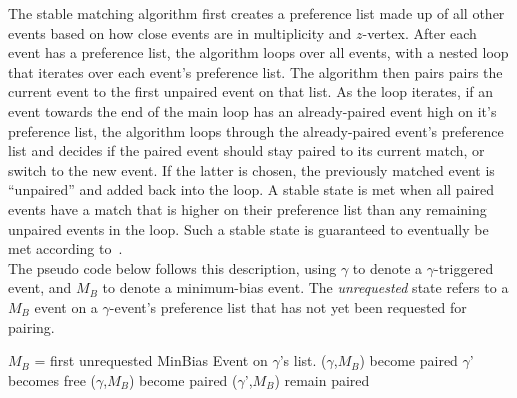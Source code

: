The stable matching algorithm first creates a preference list made up of all other events based on how close events are in multiplicity and $z$-vertex. After each event has a preference list, the algorithm loops over all events, with a nested loop that iterates over each event's preference list. The algorithm then pairs  pairs the current event to the first unpaired event on that list. As the loop iterates, if an event towards the end of the main loop has an already-paired event high on it’s preference list, the algorithm loops through the already-paired event's preference list and decides if the paired event should stay paired to its current match, or switch to the new event. If the latter is chosen, the previously matched event is “unpaired” and added back into the loop. A stable state is met when all paired events have a match that is higher on their preference list than any remaining unpaired events in the loop. Such a stable state is guaranteed to eventually be met according to~\cite{GALE1985223}.\\

The pseudo code below follows this description, using \(\gamma\) to denote a \(\gamma\)-triggered event, and \(M_B\) to denote a minimum-bias event. The \textit{unrequested} state refers to a \(M_B\) event on a \(\gamma\)-event's preference list that has not yet been requested for pairing.\\

\FloatBarrier
\begin{algorithmic}
  \State \(M_B\) = first unrequested MinBias Event on \(\gamma\)'s list.
  \State (\(\gamma\),\(M_B\)) become paired
  \State \(\gamma\)' becomes free
  \State (\(\gamma\),\(M_B\)) become paired
  \Else
  \State (\(\gamma\)',\(M_B\)) remain paired
  \EndIf
  \EndIf
  \EndWhile
  \EndProcedure
\end{algorithmic}

